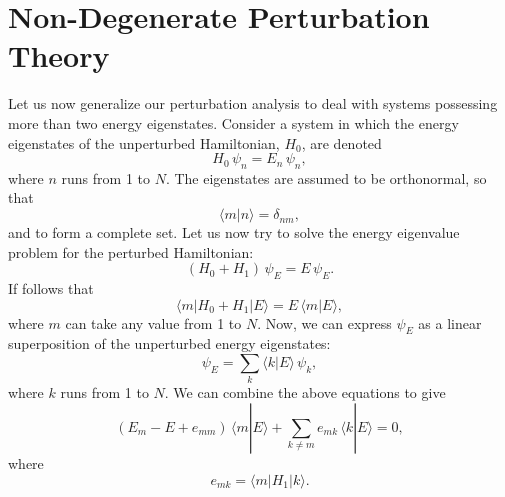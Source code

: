 \section{Non-Degenerate Perturbation Theory}\label{e12.4}
Let us now generalize our perturbation analysis to deal
with systems possessing more than two energy eigenstates. 
Consider a system in which the energy
eigenstates of the unperturbed Hamiltonian, $H_0$, are denoted
\begin{equation}
H_0\,\psi_n = E_n\,\psi_n,
\end{equation}
where $n$ runs from 1 to $N$. The eigenstates are assumed to
be orthonormal, so that
\begin{equation}
\langle m|n\rangle = \delta_{nm},
\end{equation}
and to form a complete set. Let us now try to
solve the energy eigenvalue problem for the perturbed Hamiltonian:
\begin{equation}
(H_0+H_1)\,\psi_E = E\,\psi_E.
\end{equation}
If follows that
\begin{equation}
\langle m|H_0+H_1|E\rangle = E\,\langle m |E\rangle,
\end{equation}
where $m$ can take any value from  1 to $N$. Now, we can express
$\psi_E$ as a linear superposition of the unperturbed energy eigenstates:
\begin{equation}
\psi_E = \sum_k \langle k|E\rangle\,\psi_k,
\end{equation}
where $k$ runs from 1 to $N$. We can combine the above
equations to give
\begin{equation}\label{e12.45}
(E_m-E+e_{mm})\,\langle m|E\rangle + \sum_{k\neq m}
e_{mk}\,\langle k|E\rangle = 0,
\end{equation}
where
\begin{equation}
e_{mk} =\langle m|H_1| k\rangle.
\end{equation}

